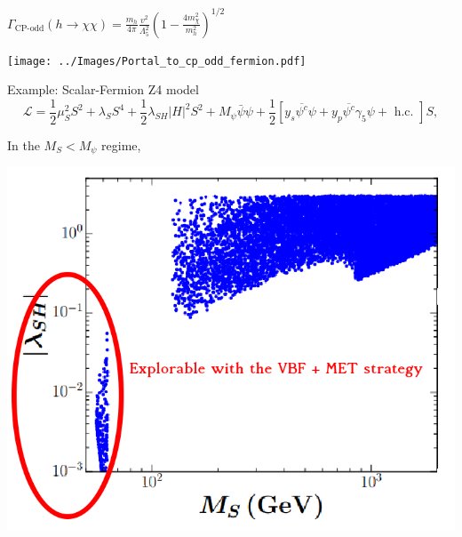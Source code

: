 \documentclass{../../bredelebeamer}
\begin{document}
\begin{frame}{$\Gamma_{\text{CP-odd}}(h \rightarrow \chi \chi)=\frac{m_h}{4 \pi} \frac{v^2}{\Lambda_5^2}\left(1-\frac{4 m_\chi^2}{m_h^2}\right)^{1 / 2}$}
    \begin{center}
        \texttt{[image: ../Images/Portal\_to\_cp\_odd\_fermion.pdf]}
    \end{center}
\end{frame}

\begin{frame}{Example: Scalar-Fermion Z4 model}
    $$
    \mathcal{L}=\frac{1}{2} \mu_S^2 S^2+\lambda_S S^4+\frac{1}{2} \lambda_{S H}|H|^2 S^2+M_\psi \bar{\psi} \psi+\frac{1}{2}\left[y_s \overline{\psi^c} \psi+y_p \overline{\psi^c} \gamma_5 \psi+\text { h.c. }\right] S,
    $$

    In the $M_S < M_\psi$ regime, 
    \begin{center}
        \includegraphics[width=.6\textwidth]{../Images/Z4_Example.png}
    \end{center}
    \cite{Yaguna:2021rds}
\end{frame}
\end{document}
